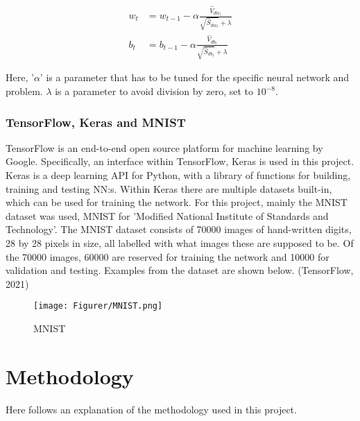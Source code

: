 \documentclass{article}
\begin{document}
\begin{equation}\label{UpdateADAM}
\begin{aligned}
w_t &= w_{t-1} - \alpha \frac{\hat{V}_{{dw}_t}}{\sqrt{\hat{S}_{{dw}_t}} + \lambda}\\
b_t &= b_{t-1} - \alpha \frac{\hat{V}_{{db}_t}}{\sqrt{\hat{S}_{{db}_t}} + \lambda}
\end{aligned}
\end{equation}

\noindent Here, '$\alpha$' is a parameter that has to be tuned for the specific neural network and problem. $\lambda$ is a parameter to avoid division by zero, set to $10^{-8}$.

\subsubsection{TensorFlow, Keras and MNIST}\label{sec: tensorflow}
TensorFlow is an end-to-end open source platform for machine learning by Google. Specifically, an interface within TensorFlow, Keras is used in this project. Keras is a deep learning API for Python, with a library of functions for building, training and testing NN:s. Within Keras there are multiple datasets built-in, which can be used for training the network. For this project, mainly the MNIST dataset was used, MNIST for 'Modified National Institute of Standards and Technology'. The MNIST dataset consists of 70000 images of hand-written digits, 28 by 28 pixels in size, all labelled with what images these are supposed to be. Of the 70000 images, 60000 are reserved for training the network and 10000 for validation and testing. Examples from the dataset are shown below. (TensorFlow,  2021)

\begin{figure}[H]
    \centering
    \texttt{[image: Figurer/MNIST.png]}
    \caption{MNIST}
    \label{Momentum}
\end{figure}

\section{Methodology}
Here follows an explanation of the methodology used in this project.
\end{document}
